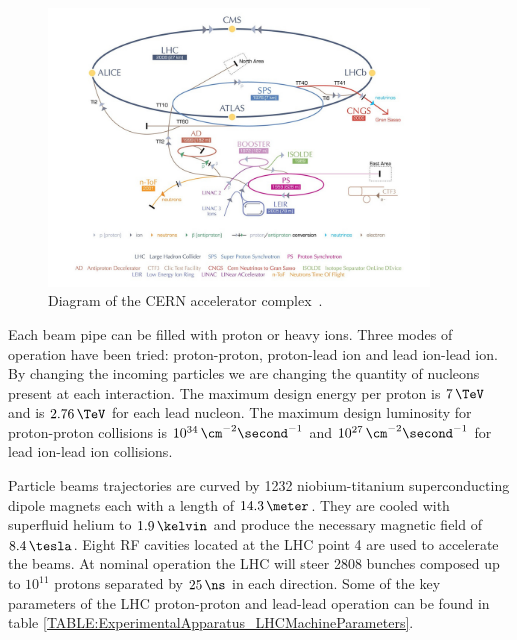 \begin{figure}[!htb]
  \centering
  \includegraphics[width=0.90\textwidth]{Chapter02/LHC/Images/CERNAcceleratorComplex.jpg}
  \caption[Diagram of the CERN accelerator complex.]
  {Diagram of the \gls{CERN} accelerator complex~\cite{IMAGEREF:CERNAcceleratorComplex}.}
  \label{FIGURE:ExperimentalApparatus_LHCAccelaratorChain}
\end{figure}

Each beam pipe can be filled with proton or heavy ions. Three modes of operation have been tried: proton-proton, proton-lead ion and lead ion-lead ion. By changing the incoming particles we are changing the quantity of nucleons present at each interaction. The maximum design energy per proton is $7\,\TeV$ and is $2.76\,\TeV$ for each lead nucleon. The maximum design luminosity for proton-proton collisions is $10^{34}\,\cm^{-2}\second^{-1}$ and $10^{27}\,\cm^{-2}\second^{-1}$ for lead ion-lead ion collisions.

Particle beams trajectories are curved by 1232 niobium-titanium superconducting dipole magnets each with a length of $14.3\,\meter$. They are cooled with superfluid helium to $1.9\,\kelvin$ and produce the necessary magnetic field of $8.4\,\tesla$. Eight \gls{RF} cavities located at the \gls{LHC} point 4 are used to accelerate the beams. At nominal operation the \gls{LHC} will steer 2808 bunches composed up to $10^{11}$ protons separated by $25\,\ns$ in each direction. Some of the key parameters of the \gls{LHC} proton-proton and lead-lead operation can be found in table \ref{TABLE:ExperimentalApparatus_LHCMachineParameters}.



